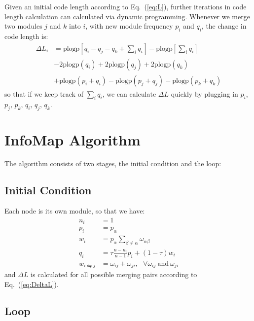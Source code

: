 \documentclass[12pt,a4paper]{article}
\begin{document}
Given an initial code length according to Eq.~(\ref{eq:L}), further iterations in code length calculation can calculated via dynamic programming. Whenever we merge two modules \(j\) and \(k\) into \(i\), with new module frequency \(p_i\) and \(q_i\), the change in code length is:
\begin{align}
    \Delta L_i &= \mathrm{plogp}\left[ q_i-q_j-q_k+\sum_i q_i \right] -\mathrm{plogp} \left[ \sum_i q_i \right] \nonumber\\
    &-2 \mathrm{plogp}(q_i) +2\mathrm{plogp}(q_j) +2\mathrm{plogp}(q_k) \nonumber\\
    &+\mathrm{plogp}(p_i+q_i) -\mathrm{plogp}(p_j+q_j) -\mathrm{plogp}(p_k+q_k)
\label{eq:DeltaL}
\end{align}
so that if we keep track of \(\sum_iq_i\), we can calculate \(\Delta L\) quickly by plugging in \(p_i\), \(p_j\), \(p_k\), \(q_i\), \(q_j\), \(q_k\).

\section{InfoMap Algorithm}

The algorithm consists of two stages, the initial condition and the loop:

\subsection{Initial Condition}

Each node is its own module, so that we have:
\begin{align*}
    n_i &= 1\\
    p_i &= p_\alpha \\
    w_i &= p_\alpha\sum_{\beta\neq\alpha}\omega_{\alpha\beta} \\
    q_i &= \tau\frac{n-n_i}{n-1}p_i +(1-\tau)w_i \\
    w_{i\leftrightharpoons j} &= \omega_{ij} +\omega_{ji}, ~~~\forall \omega_{ij}~\mathrm{and}~\omega_{ji}
\end{align*}
and \(\Delta L\) is calculated for all possible merging pairs according to Eq.~(\ref{eq:DeltaL}).

\subsection{Loop}
\end{document}

